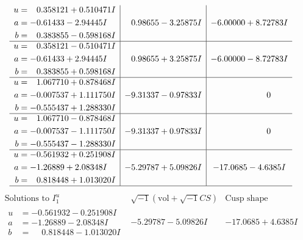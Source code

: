 \documentclass[1p]{elsarticle_modified}
\theoremstyle{definition}
\newcommand{\I}{\sqrt{-1}}
\begin{document}
$$\begin{array}{c|c|c}
\begin{aligned}
u &= \phantom{-}0.358121 + 0.510471 I \\
a &= -0.61433 - 2.94445 I \\
b &= \phantom{-}0.383855 - 0.598168 I\end{aligned}
 & \phantom{-}0.98655 - 3.25875 I & -6.00000 + 8.72783 I \\ \hline\begin{aligned}
u &= \phantom{-}0.358121 - 0.510471 I \\
a &= -0.61433 + 2.94445 I \\
b &= \phantom{-}0.383855 + 0.598168 I\end{aligned}
 & \phantom{-}0.98655 + 3.25875 I & -6.00000 - 8.72783 I \\ \hline\begin{aligned}
u &= \phantom{-}1.067710 + 0.878468 I \\
a &= -0.007537 + 1.111750 I \\
b &= -0.555437 + 1.288330 I\end{aligned}
 & -9.31337 - 0.97833 I & \phantom{-0.000000 } 0 \\ \hline\begin{aligned}
u &= \phantom{-}1.067710 - 0.878468 I \\
a &= -0.007537 - 1.111750 I \\
b &= -0.555437 - 1.288330 I\end{aligned}
 & -9.31337 + 0.97833 I & \phantom{-0.000000 } 0 \\ \hline\begin{aligned}
u &= -0.561932 + 0.251908 I \\
a &= -1.26889 + 2.08348 I \\
b &= \phantom{-}0.818448 + 1.013020 I\end{aligned}
 & -5.29787 + 5.09826 I & -17.0685 - 4.6385 I\\
 \hline 
 \end{array}$$\newpage$$\begin{array}{c|c|c}  
\text{Solutions to }I^u_{1}& \I (\text{vol} + \sqrt{-1}CS) & \text{Cusp shape}\\
 \hline 
\begin{aligned}
u &= -0.561932 - 0.251908 I \\
a &= -1.26889 - 2.08348 I \\
b &= \phantom{-}0.818448 - 1.013020 I\end{aligned}
 & -5.29787 - 5.09826 I & -17.0685 + 4.6385 I \\ \hline\begin{aligned}

\end{aligned}
\end{array}$$
\end{document}

